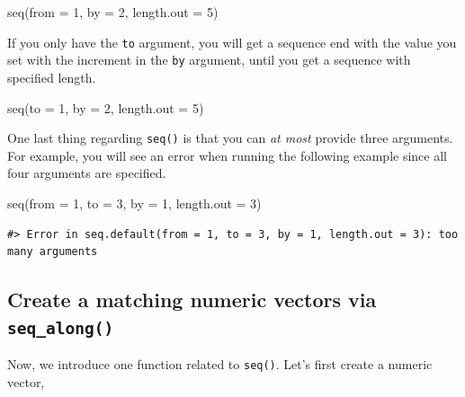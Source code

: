 \documentclass[
]{book}
\newenvironment{Shaded}{\begin{snugshade}}{\end{snugshade}}
\newcommand{\AttributeTok}[1]{\textcolor[rgb]{0.77,0.63,0.00}{#1}}
\newcommand{\DecValTok}[1]{\textcolor[rgb]{0.00,0.00,0.81}{#1}}
\newcommand{\FunctionTok}[1]{\textcolor[rgb]{0.00,0.00,0.00}{#1}}
\newcommand{\NormalTok}[1]{#1}
\begin{document}
\begin{Shaded}
\begin{Highlighting}[]
\FunctionTok{seq}\NormalTok{(}\AttributeTok{from =} \DecValTok{1}\NormalTok{, }\AttributeTok{by =} \DecValTok{2}\NormalTok{, }\AttributeTok{length.out =} \DecValTok{5}\NormalTok{)}
\end{Highlighting}
\end{Shaded}

If you only have the \texttt{to} argument, you will get a sequence end with the value you set with the increment in the \texttt{by} argument, until you get a sequence with specified length.

\begin{Shaded}
\begin{Highlighting}[]
\FunctionTok{seq}\NormalTok{(}\AttributeTok{to =} \DecValTok{1}\NormalTok{, }\AttributeTok{by =} \DecValTok{2}\NormalTok{, }\AttributeTok{length.out =} \DecValTok{5}\NormalTok{)}
\end{Highlighting}
\end{Shaded}

One last thing regarding \texttt{seq()} is that you can \emph{at most} provide three arguments. For example, you will see an error when running the following example since all four arguments are specified.

\begin{Shaded}
\begin{Highlighting}[]
\FunctionTok{seq}\NormalTok{(}\AttributeTok{from =} \DecValTok{1}\NormalTok{, }\AttributeTok{to =} \DecValTok{3}\NormalTok{, }\AttributeTok{by =} \DecValTok{1}\NormalTok{, }\AttributeTok{length.out =} \DecValTok{3}\NormalTok{)}
\end{Highlighting}
\end{Shaded}

\begin{verbatim}
#> Error in seq.default(from = 1, to = 3, by = 1, length.out = 3): too many arguments
\end{verbatim}

\hypertarget{create-a-matching-numeric-vectors-via-seq_along}{%
\subsection{\texorpdfstring{Create a matching numeric vectors via \texttt{seq\_along()}}{Create a matching numeric vectors via seq\_along()}}\label{create-a-matching-numeric-vectors-via-seq_along}}

Now, we introduce one function related to \texttt{seq()}. Let's first create a numeric vector,
\end{document}
